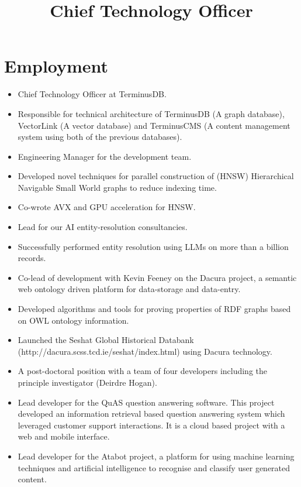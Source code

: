 \documentclass[a4paper,11pt]{moderncv}
\title{Chief Technology Officer}
\begin{document}
\maketitle

\section{Employment}

{
  \begin{itemize}
  \item Chief Technology Officer at TerminusDB.
  \item Responsible for technical architecture of TerminusDB (A graph database), VectorLink (A vector database) and TerminusCMS (A content management system using both of the previous databases).
  \item Engineering Manager for the development team.
  \item Developed novel techniques for parallel construction of (HNSW) Hierarchical Navigable Small World graphs to reduce indexing time.
  \item Co-wrote AVX and GPU acceleration for HNSW.
  \item Lead for our AI entity-resolution consultancies.
  \item Successfully performed entity resolution using LLMs on more
    than a billion records.
  \end{itemize}
}

{
  \begin{itemize}
  \item Co-lead of development with Kevin Feeney on the Dacura project, a semantic web ontology driven platform for data-storage and data-entry.
  \item Developed algorithms and tools for proving properties of RDF graphs based on OWL ontology information.
  \item Launched the Seshat Global Historical Databank (http://dacura.scss.tcd.ie/seshat/index.html) using Dacura technology.
  \end{itemize}
}

{
  \begin{itemize}
  \item A post-doctoral position with a team of four developers including the principle investigator (Deirdre Hogan).
  \item Lead developer for the QuAS question answering software. This project developed an information retrieval based question answering system which leveraged customer support interactions. It is a cloud based project with a web and mobile interface.
  \item Lead developer for the Atabot project, a platform for using machine learning techniques and artificial intelligence to recognise and classify user generated content.
  \end{itemize}
}
\end{document}
